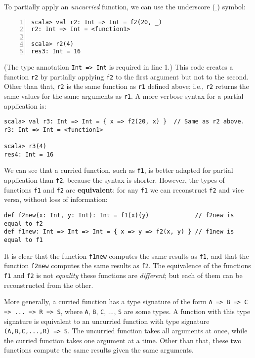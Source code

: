 To partially apply an \emph{uncurried} function, we can use the underscore
($\_$) symbol:
\begin{lstlisting}[numbers=left]
scala> val r2: Int => Int = f2(20, _)
r2: Int => Int = <function1>

scala> r2(4)
res3: Int = 16
\end{lstlisting}
(The type annotation \lstinline!Int => Int! is required in line 1.)
This code creates a function \lstinline!r2! by partially applying
\lstinline!f2! to the first argument but not to the second. Other
than that, \lstinline!r2! is the same function as \lstinline!r1!
defined above; i.e., \lstinline!r2! returns the same values for the
same arguments as \lstinline!r1!. A more verbose syntax for a partial
application is:
\begin{lstlisting}
scala> val r3: Int => Int = { x => f2(20, x) }  // Same as r2 above.
r3: Int => Int = <function1>

scala> r3(4)
res4: Int = 16
\end{lstlisting}

We can see that a curried function, such as \lstinline!f1!, is better
adapted for partial application than \lstinline!f2!, because the
syntax is shorter. However, the types of functions \lstinline!f1!
and \lstinline!f2! are\textbf{ equivalent}:
for any \lstinline!f1! we can reconstruct \lstinline!f2! and vice
versa, without loss of information:
\begin{lstlisting}
def f2new(x: Int, y: Int): Int = f1(x)(y)             // f2new is equal to f2
def f1new: Int => Int => Int = { x => y => f2(x, y) } // f1new is equal to f1
\end{lstlisting}
It is clear that the function \lstinline!f1new! computes the same
results as \lstinline!f1!, and that the function \lstinline!f2new!
computes the same results as \lstinline!f2!. The equivalence of the
functions \lstinline!f1! and \lstinline!f2! is not \emph{equality}
 \textemdash{} these functions are \emph{different}; but each of them
can be reconstructed from the other. 

More generally, a curried function has a type signature of the form
\lstinline!A => B => C => ... => R => S!, where \lstinline!A!, \lstinline!B!,
\lstinline!C!, ..., \lstinline!S! are some types. A function with
this type signature is equivalent to an uncurried
function with type signature \lstinline!(A,B,C,...,R) => S!. The
uncurried function takes all arguments at once, while the curried
function takes one argument at a time. Other than that, these two
functions compute the same results given the same arguments.

